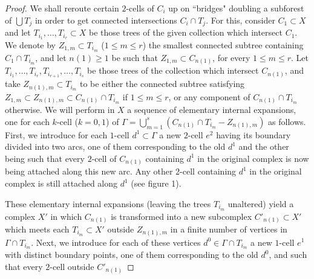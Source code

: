 \documentclass{amsart}[12pt]
\theoremstyle{definition}
\theoremstyle{remark}
\numberwithin{equation}{section}
\begin{document}
\begin{proof} We shall reroute certain $2$-cells of $C_i$ up on ``bridges"
doubling a subforest of $\bigcup T_j$ in order to get connected
intersections $C_i \cap T_j$. For this, consider $C_1 {\subset} X$ and
let $T_{i_1}, \dots, T_{i_r} {\subset} X$ be those trees of the given
collection which intersect $C_1$. We denote by $Z_{1,m} {\subset}
T_{i_m}$ ($1 \leq m \leq r$) the smallest connected subtree
containing $C_1 \cap T_{i_m}$, and let $n(1) \geq 1$ be such that
$Z_{1,m} {\subset} C_{n(1)}$, for every $1 \leq m \leq r$. Let
$T_{i_1}, \dots , T_{i_r}, T_{i_{r+1}}, \dots, T_{i_s}$ be those
trees of the collection which intersect $C_{n(1)}$, and take
$Z_{n(1),m} {\subset} T_{i_m}$ to be either the connected subtree
satisfying $Z_{1,m} {\subset} Z_{n(1),m} {\subset} C_{n(1)} \cap T_{i_m}$ if
$1 \leq m \leq r$, or any component of $C_{n(1)} \cap T_{i_m}$
otherwise. We will perform in $X$ a sequence of elementary
internal expansions, one for each $k$-cell ($k=0,1$) of $
\displaystyle \Gamma = \bigcup_{m=1}^s ( C_{n(1)} \cap T_{i_m} -
Z_{n(1),m} )$ as follows. First, we introduce for each $1$-cell
$d^1 {\subset} \Gamma$ a new $2$-cell $e^2$ having its boundary divided
into two arcs, one of them corresponding to the old $d^1$ and the
other being such that every $2$-cell of $C_{n(1)}$ containing
$d^1$ in the original complex is now being attached along this new
arc. Any other $2$-cell containing $d^1$ in the original complex
is still
attached along $d^1$ (see figure 1).\\
\begin{figure}
\centerline{}
\vspace{-10mm} \label{figure1} \caption{}
\end{figure}
\begin{figure}
\centerline{}
\vspace{-10mm} \label{figure2} \caption{}
\end{figure}
\indent These elementary internal expansions (leaving the trees
$T_{i_m}$ unaltered) yield a complex $X'$ in which $C_{n(1)}$ is
transformed into a new subcomplex $C'_{n(1)} {\subset} X'$ which meets
each $T_{i_m} {\subset} X'$ outside $Z_{n(1),m}$ in a finite number of
vertices in $\Gamma \cap T_{i_m}$. Next, we introduce for each of
these vertices $d^0 \in \Gamma \cap T_{i_m}$ a new $1$-cell $e^1$
with distinct boundary points, one of them corresponding to the
old $d^0$, and such that every $2$-cell outside $C'_{n(1)}$

\end{proof}
\end{document}
